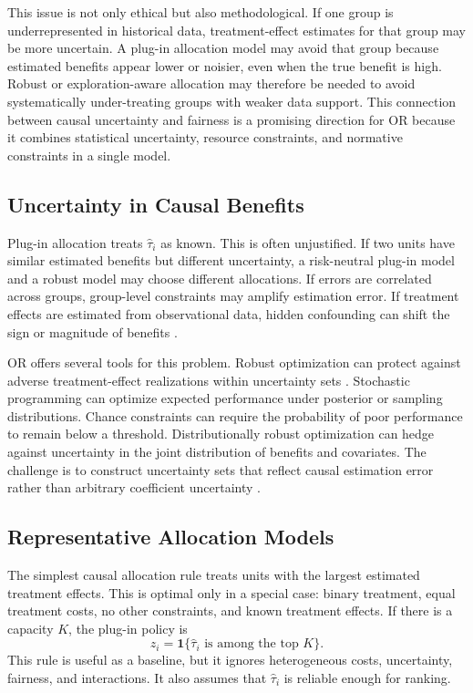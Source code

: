 \documentclass[11pt]{article}
\begin{document}
This issue is not only ethical but also methodological. If one group is underrepresented in historical data, treatment-effect estimates for that group may be more uncertain. A plug-in allocation model may avoid that group because estimated benefits appear lower or noisier, even when the true benefit is high. Robust or exploration-aware allocation may therefore be needed to avoid systematically under-treating groups with weaker data support. This connection between causal uncertainty and fairness is a promising direction for OR because it combines statistical uncertainty, resource constraints, and normative constraints in a single model.

\subsection{Uncertainty in Causal Benefits}

Plug-in allocation treats $\hat{\tau}_i$ as known. This is often unjustified. If two units have similar estimated benefits but different uncertainty, a risk-neutral plug-in model and a robust model may choose different allocations. If errors are correlated across groups, group-level constraints may amplify estimation error. If treatment effects are estimated from observational data, hidden confounding can shift the sign or magnitude of benefits \citep{rosenbaum2002observational,kallus2018confounding}.

OR offers several tools for this problem. Robust optimization can protect against adverse treatment-effect realizations within uncertainty sets \citep{ben2009robust,bertsimas2011theory}. Stochastic programming can optimize expected performance under posterior or sampling distributions. Chance constraints can require the probability of poor performance to remain below a threshold. Distributionally robust optimization can hedge against uncertainty in the joint distribution of benefits and covariates. The challenge is to construct uncertainty sets that reflect causal estimation error rather than arbitrary coefficient uncertainty \citep{duchi2023drocausal}.

\subsection{Representative Allocation Models}

The simplest causal allocation rule treats units with the largest estimated treatment effects. This is optimal only in a special case: binary treatment, equal treatment costs, no other constraints, and known treatment effects. If there is a capacity $K$, the plug-in policy is
\[
    z_i = \mathbf{1}\{\hat{\tau}_i \text{ is among the top } K\}.
\]
This rule is useful as a baseline, but it ignores heterogeneous costs, uncertainty, fairness, and interactions. It also assumes that $\hat{\tau}_i$ is reliable enough for ranking.
\end{document}
